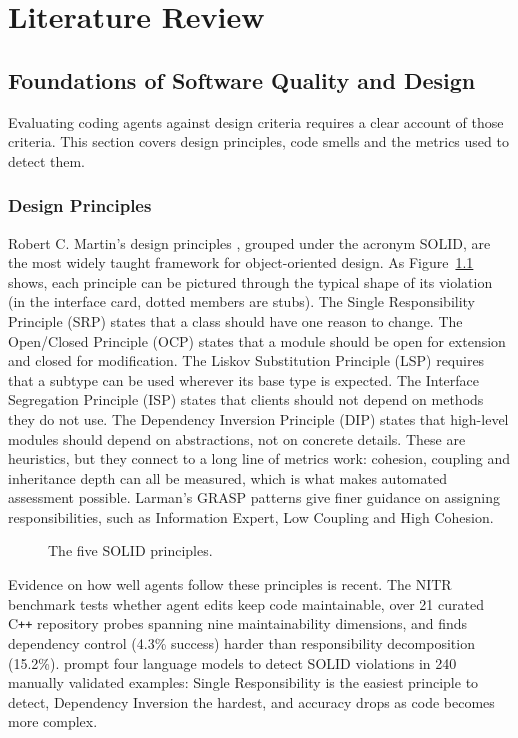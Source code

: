 \chapter{Literature Review}
\label{ch:literature}
\newpage

\section{Foundations of Software Quality and Design}
\label{sec:foundations}

Evaluating coding agents against design criteria requires a clear account of those criteria. This
section covers design principles, code smells and the metrics used to detect them.

\subsection{Design Principles}
\label{sec:design-principles}

Robert C. Martin's design principles \citep{martin2000solid,martin2003agile}, grouped under the
acronym SOLID, are the most widely taught framework for object-oriented design.
As Figure~\ref{fig:solid-wheel} shows, each principle can be pictured through the typical shape of
its violation (in the interface card, dotted members are stubs). The Single Responsibility Principle (SRP) states that a class should
have one reason to change. The Open/Closed Principle (OCP) states that a module should be open for
extension and closed for modification. The Liskov Substitution Principle (LSP) requires that a
subtype can be used wherever its base type is expected. The Interface Segregation Principle (ISP)
states that clients should not depend on methods they do not use. The Dependency Inversion
Principle (DIP) states that high-level modules should depend on abstractions, not on concrete
details. These are heuristics, but they connect to a long line of metrics work: cohesion, coupling
and inheritance depth can all be measured, which is what makes automated assessment possible.
Larman's GRASP patterns \citep{larman2004grasp} give finer guidance on assigning responsibilities,
such as Information Expert, Low Coupling and High Cohesion.

\begin{figure}[htb]
\centering

\caption{The five SOLID principles.}
\label{fig:solid-wheel}
\end{figure}

Evidence on how well agents follow these principles is recent. The NITR benchmark
\citep{zhu2026nitr} tests whether agent edits keep code maintainable, over 21 curated C\texttt{++}
repository probes spanning nine maintainability dimensions, and finds dependency control (4.3\%
success) harder than responsibility decomposition (15.2\%). \citet{pehlivan2025solid}
prompt four language models to detect SOLID violations in 240 manually validated examples: Single
Responsibility is the easiest principle to detect, Dependency Inversion the hardest, and accuracy
drops as code becomes more complex.

